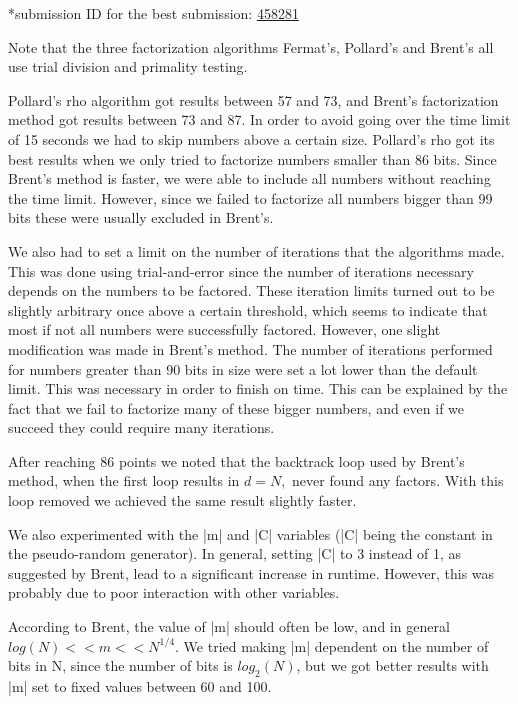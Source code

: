 \documentclass[paper=a4, fontsize=11pt,numbers=endperiod]{scrartcl} %
\numberwithin{equation}{section} %
\numberwithin{figure}{section} %
\numberwithin{table}{section} %
\begin{document}
    \footnotesize{*submission ID for the best submission: \href{https://kth.kattis.scrool.se/submission?id=458281}{458281}
    \normalsize

Note that the three factorization algorithms Fermat's, Pollard's and Brent's all use trial division and primality testing.

Pollard's rho algorithm got results between 57 and 73, and Brent's factorization method got results between 73 and 87.
In order to avoid going over the time limit of 15 seconds we had to skip numbers above a certain size.
Pollard's rho got its best results when we only tried to factorize numbers smaller than 86 bits.
Since Brent's method is faster, we were able to include all numbers without reaching the time limit. However, since we failed to factorize all numbers bigger than 99 bits these were usually excluded in Brent's.

We also had to set a limit on the number of iterations that the algorithms made.
This was done using trial-and-error since the number of iterations necessary depends on the numbers to be factored.
These iteration limits turned out to be slightly arbitrary once above a certain threshold, which seems to indicate that most if not all numbers were successfully factored.
However, one slight modification was made in Brent's method.
The number of iterations performed for numbers greater than 90 bits in size were set a lot lower than the default limit.
This was necessary in order to finish on time.
This can be explained by the fact that we fail to factorize many of these bigger numbers, 
and even if we succeed they could require many iterations.

After reaching 86 points we noted that the backtrack loop used by Brent's method, when the first loop results in $d = N,$ never found any factors.
With this loop removed we achieved the same result slightly faster.

We also experimented with the |m| and |C| variables (|C| being the constant in the pseudo-random generator).
In general, setting |C| to 3 instead of 1, as suggested by Brent, lead to a significant increase in runtime.
However, this was probably due to poor interaction with other variables.

According to Brent, the value of |m| should often be low, and in general $log(N) << m << N^{1/4}$.
We tried making |m| dependent on the number of bits in N, since the number of bits is $log_2(N)$, but we got better results with |m| set to fixed values between 60 and 100.

}
\end{document}
